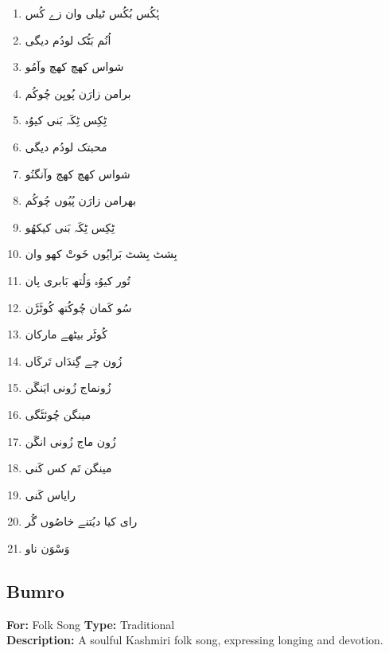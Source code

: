 \documentclass[12pt]{article}
\newcommand{\bigarabic}[1]{\fontsize{16pt}{18pt}\selectfont \textarabic{#1}}
\begin{document}
\begin{multicols}{2}
\begin{multicols}{2}
\begin{RTL}
\begin{enumerate}[leftmargin=*, label=\arabic*., font=\fontsize{16pt}{18pt}\selectfont]
  \item \bigarabic{ہُکُس بُکُس ٹیلی وان زے کُس}
  \item \bigarabic{اُنُم بَٹُک لودُم دیگی}
  \item \bigarabic{شواس کھچ کھچ وآمُو}
  \item \bigarabic{برامن زارَن پُویِن چُوکُم}
  \item \bigarabic{ٹِکِس ٹِکَہ بَنی کیوُہ}
  \item \bigarabic{محبتک لودُم دیگی}
  \item \bigarabic{شواس کھچ کھچ وآنگنُو}
  \item \bigarabic{بھرامن زارَن پُیُوں چُوکُم}
  \item \bigarabic{ٹِکِس ٹِکَہ بَنی کیکھُو}
  \item \bigarabic{بِشٹ بِشٹ بَرایُوں خَوتْ کھو وان}
  \item \bigarabic{تُور کیوُہ وَلُتھ بَابری پان}
  \item \bigarabic{سُو کَمان چُوکُتھ کُوٹَڑَن}
  \item \bigarabic{کُوٹَر بیٹھے مارکان}
  \item \bigarabic{زُون چے گِندَاں تَرکَاں}
  \item \bigarabic{زُونماج زُونی ایَنگَن}
  \item \bigarabic{مینگن چُوئٹَگی}
  \item \bigarabic{زُون ماج زُونی انگَن}
  \item \bigarabic{مینگن تَم کس کَنی}
  \item \bigarabic{رایاس کَنی}
  \item \bigarabic{رای کیا دیُتنے خاصُوں گُر}
  \item \bigarabic{وَسْوَن ناو}
\end{enumerate}
\end{RTL}
\end{multicols}

\subsection*{Bumro}
\textbf{For:} Folk Song \quad \textbf{Type:} Traditional\\
\textbf{Description:} A soulful Kashmiri folk song, expressing longing and devotion.


\end{multicols}
\end{document}
